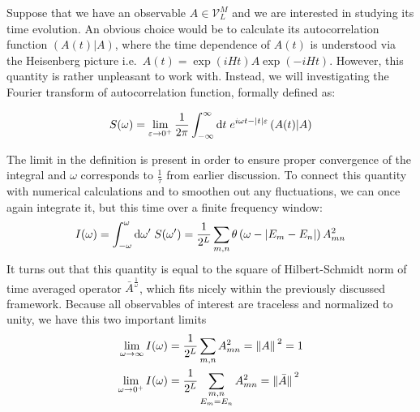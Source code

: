 Suppose that we have an observable \(A \in \mathcal{V}_L^M\) and we are interested in studying its time
evolution. An obvious choice would be to calculate its autocorrelation function
\((A(t)|A)\), where the time dependence of \(A(t)\) is understood
via the Heisenberg picture i.e.\ \(A(t) = \exp\left(i H t\right) A
\exp\left(-i H t\right)\). However, this quantity is rather unpleasant to work with.
Instead, we will investigating the Fourier transform of autocorrelation function, formally
defined as:
\begin{definition}  
  \begin{equation*}
  S(\omega) =  \lim _{\varepsilon \to 0^+} \frac{1}{2 \pi} \int_{-\infty}^{\infty} \mathrm{d} t 
  \; e^{i \omega t-|t| \varepsilon}\left(A(t) \middle| A\right)
  \end{equation*}
  \label{def:spectral function}
\end{definition}
The limit in the definition is present in order to ensure proper convergence of the integral
and \(\omega{}\) corresponds to \(\frac{1}{\tau}\) from earlier discussion.
To connect this quantity with numerical calculations and to smoothen out any fluctuations, we
can once again integrate it, but this time over a finite frequency window:
\begin{equation}
  I(\omega) = \int_{-\omega}^{\omega} \mathrm{d}\omega' \; S(\omega') = 
  \frac{1}{2^L} \sum_{m,n} \theta\left(\omega - |E_m-E_n|\right) A_{mn}^2
\end{equation}
It turns out that this quantity is equal to the square of Hilbert-Schmidt norm of time
averaged operator \(\bar{A}^{\frac{1}{\omega}}\), which fits nicely within the previously
discussed framework. Because all observables of interest are traceless and
normalized to unity, we have this two important limits
\begin{align}
  \lim_{\omega \to \infty } I(\omega) &= \frac{1}{2^L}\sum_{m,n} A_{mn}^2 = \norm*{A}^2 = 1\\
  \lim_{\omega \to 0^+ } I(\omega) &= \frac{1}{2^L} \sum_{ \substack{m,n\\E_m=E_n} } A_{mn}^2 = \norm*{\bar{A}}^2
\end{align}

